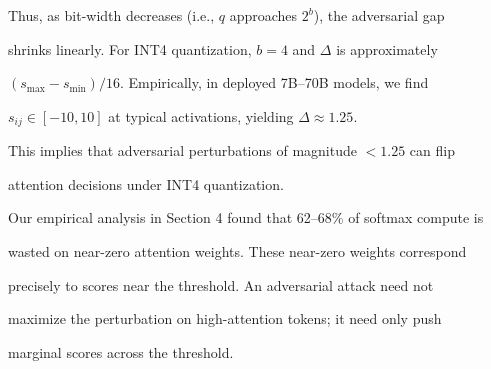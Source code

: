 Thus, as bit-width decreases (i.e., $q$ approaches $2^b$), the adversarial gap






shrinks linearly.  For INT4 quantization, $b=4$ and $\Delta$ is approximately






$(s_{\max} - s_{\min}) / 16$.  Empirically, in deployed 7B--70B models, we find






$s_{ij} \in [-10, 10]$ at typical activations, yielding $\Delta \approx 1.25$.






This implies that adversarial perturbations of magnitude $<1.25$ can flip






attention decisions under INT4 quantization.













Our empirical analysis in Section 4 found that 62--68\% of softmax compute is






wasted on near-zero attention weights.  These near-zero weights correspond






precisely to scores near the threshold.  An adversarial attack need not






maximize the perturbation on high-attention tokens; it need only push






marginal scores across the threshold.













